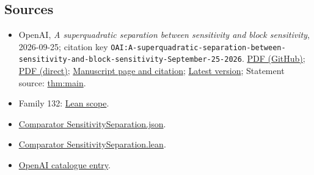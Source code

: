 \documentclass[11pt]{article}
\begin{document}
\subsection{Sources}
\begin{itemize}
\item OpenAI, \emph{A superquadratic separation between sensitivity and block sensitivity}, 2026-09-25; citation key \texttt{OAI:A-superquadratic-separation-between-sensitivity-and-block-sensitivity-September-25-2026}. \href{https://github.com/openai/math/blob/adc7f1241b42e322a6451854ab7e4b4c146bf78a/preprints/A-superquadratic-separation-between-sensitivity-and-block-sensitivity-September-25-2026/paper.pdf}{PDF (GitHub)}; \href{https://github.com/openai/math/raw/adc7f1241b42e322a6451854ab7e4b4c146bf78a/preprints/A-superquadratic-separation-between-sensitivity-and-block-sensitivity-September-25-2026/paper.pdf}{PDF (direct)}; \href{https://github.com/openai/math/blob/adc7f1241b42e322a6451854ab7e4b4c146bf78a/preprints/A-superquadratic-separation-between-sensitivity-and-block-sensitivity-September-25-2026/README.md}{Manuscript page and citation}; \href{https://github.com/openai/math/blob/main/preprints/A-superquadratic-separation-between-sensitivity-and-block-sensitivity-September-25-2026/paper.pdf}{Latest version}; Statement source: \href{https://github.com/openai/math/blob/adc7f1241b42e322a6451854ab7e4b4c146bf78a/preprints/A-superquadratic-separation-between-sensitivity-and-block-sensitivity-September-25-2026/build/sections/00-introduction.tex\#L53}{thm:main}.
\item Family 132: \href{https://github.com/openai/math/blob/adc7f1241b42e322a6451854ab7e4b4c146bf78a/lean/docs/132.md}{Lean scope}.
\item \href{https://github.com/openai/math/blob/adc7f1241b42e322a6451854ab7e4b4c146bf78a/lean/ComparatorChallenges/SensitivitySeparation.json}{Comparator SensitivitySeparation.json}.
\item \href{https://github.com/openai/math/blob/adc7f1241b42e322a6451854ab7e4b4c146bf78a/lean/ComparatorChallenges/SensitivitySeparation.lean}{Comparator SensitivitySeparation.lean}.
\item \href{https://github.com/openai/math/blob/adc7f1241b42e322a6451854ab7e4b4c146bf78a/CONTENTS.md}{OpenAI catalogue entry}.
\end{itemize}
\end{document}
